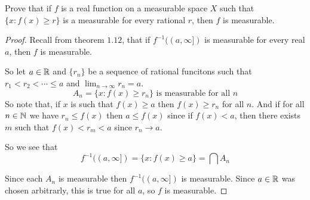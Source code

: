     \begin{exercise}
        Prove that if $f$ is a real function on a measurable space $X$ such that $\{x\colon f(x)\geq r\}$ is a measurable for every rational $r$, then $f$ is measurable.
    
        \begin{proof}
            Recall from theorem $1.12$, that if $f^{-1}((a,\infty])$ is measurable for every real $a$, then $f$ is measurable.

            So let $a\in \mathbb{R}$ and $\{r_n\}$ be a sequence of rational funcitons such that $r_1<r_2<\cdots\leq a$ and $\lim_{n\rightarrow\infty} r_n = a$. \[A_n = \{x\colon f(x)\geq r_n\} \text{ is measurable for all } n\] So note that, if $x$ is such that $f(x)\geq a$ then $f(x)\geq r_n$ for all $n$. 
            And if for all $n\in\mathbb{N}$ we have $r_n\leq f(x)$ then $a\leq f(x)$ since if $f(x)<a$, then there exists $m$ such that $f(x)<r_m<a$ since $r_n\rightarrow a$.
        
        So we see that \begin{equation}
            f^{-1}((a,\infty]) = \{x\colon f(x)\geq a\} = \bigcap A_n
        \end{equation}

        Since each $A_n$ is measurable then $f^{-1}((a,\infty])$ is measurable. Since $a\in \mathbb{R}$ was chosen arbitrarly, this is true for all $a$, so $f$ is measurable.
        \end{proof}
    \end{exercise}


